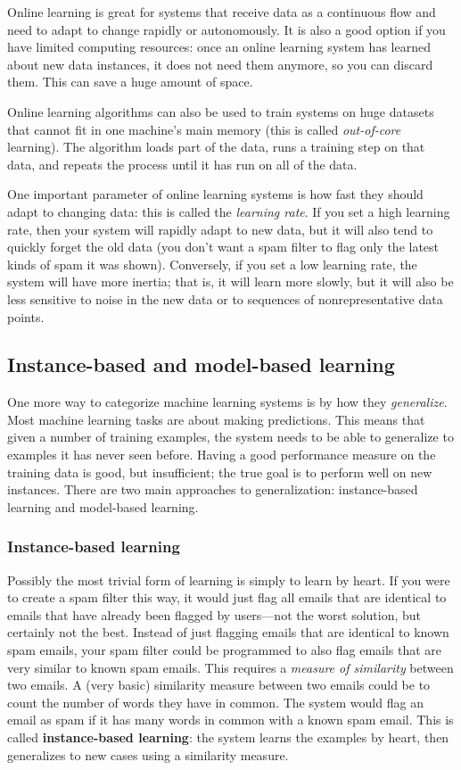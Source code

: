 Online learning is great for systems that receive data as a continuous flow and need to adapt to change rapidly or autonomously. It is also a good option if you have limited computing resources: once an online learning system has learned about new data instances, it does not need them anymore, so you can discard them. This can save a huge amount of space.

Online learning algorithms can also be used to train systems on huge datasets that cannot fit in one machine's main memory (this is called \emph{out-of-core} learning). The algorithm loads part of the data, runs a training step on that data, and repeats the process until it has run on all of the data.

One important parameter of online learning systems is how fast they should adapt to changing data: this is called the \emph{learning rate}. If you set a high learning rate, then your system will rapidly adapt to new data, but it will also tend to quickly forget the old data (you don't want a spam filter to flag only the latest kinds of spam it was shown). Conversely, if you set a low learning rate, the system will have more inertia; that is, it will learn more slowly, but it will also be less sensitive to noise in the new data or to sequences of nonrepresentative data points.
\subsection{Instance-based and model-based learning}
One more way to categorize machine learning systems is by how they \emph{generalize}. Most machine learning tasks are about making predictions. This means that given a number of training examples, the system needs to be able to generalize to examples it has never seen before. Having a good performance measure on the training data is
good, but insufficient; the true goal is to perform well on new instances. There are two main approaches to generalization: instance-based learning and model-based learning.
\subsubsection{Instance-based learning}
Possibly the most trivial form of learning is simply to learn by heart. If you were to create a spam filter this way, it would just flag all emails that are identical to emails that have already been flagged by users—not the worst solution, but certainly not the best. Instead of just flagging emails that are identical to known spam emails, your spam filter could be programmed to also flag emails that are very similar to known spam emails. This requires a \emph{measure of similarity} between two emails. A (very basic) similarity measure between two emails could be to count the number of words they have in common. The system would flag an email as spam if it has many words in common with a known spam email. This is called \textbf{instance-based learning}: the system learns the examples by heart, then generalizes to new cases using a similarity measure.
